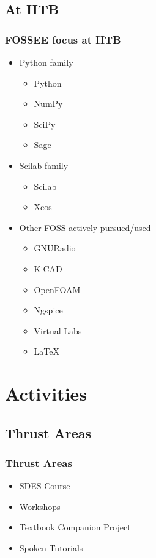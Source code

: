 \documentclass[compress,red]{beamer} %
\begin{document}
\subsection{At IITB}
\begin{frame}
\frametitle{FOSSEE focus at IITB}
\begin{itemize}
\item Python family \pause
   \begin{itemize}
   \item Python
   \item NumPy
   \item SciPy
   \item Sage \pause
   \end{itemize}
\item Scilab family \pause
   \begin{itemize}
   \item Scilab
   \item Xcos \pause
   \end{itemize}
\item Other FOSS actively pursued/used \pause
   \begin{itemize}
   \item GNURadio
   \item KiCAD
   \item OpenFOAM
   \item Ngspice
   \item Virtual Labs
   \item \LaTeX %
   \end{itemize}
\end{itemize}
\end{frame}

\section{Activities}

\subsection{Thrust Areas}
\begin{frame}
\frametitle{Thrust Areas}
\begin{itemize}
\item SDES Course \pause
\item Workshops  \pause
\item Textbook Companion Project  \pause
\item Spoken Tutorials \pause
\end{itemize}
\end{frame}
\end{document}
